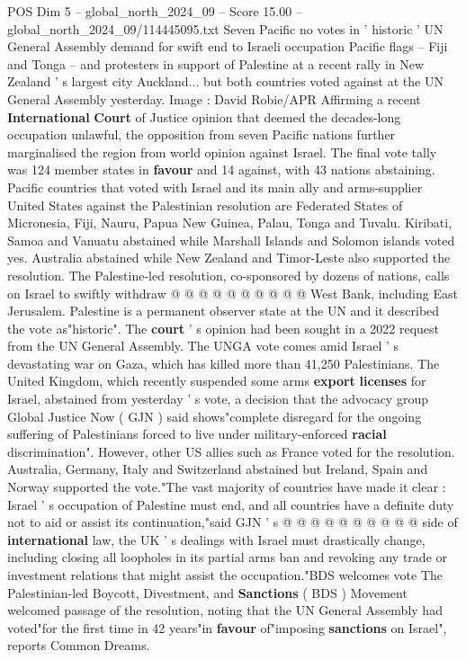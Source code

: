 \begin{textsample}{POS Dim 5 – global\_north\_2024\_09 – Score 15.00 – global\_north\_2024\_09/114445095.txt}  \label{ex:f5_pos_355}
Seven Pacific no votes in ' historic ' UN General Assembly demand for swift end to Israeli occupation Pacific flags -- Fiji and Tonga -- and protesters in support of Palestine at a recent rally in New Zealand ' s largest city Auckland... but both countries voted against at the UN General Assembly yesterday.
Image : David Robie/APR Affirming a recent \textbf{International} \textbf{Court} of Justice opinion that deemed the decades-long occupation unlawful, the opposition from seven Pacific nations further marginalised the region from world opinion against Israel.
The final vote tally was 124 member states in \textbf{favour} and 14 against, with 43 nations abstaining.
Pacific countries that voted with Israel and its main ally and arms-supplier United States against the Palestinian resolution are Federated States of Micronesia, Fiji, Nauru, Papua New Guinea, Palau, Tonga and Tuvalu.
Kiribati, Samoa and Vanuatu abstained while Marshall Islands and Solomon islands voted yes.
Australia abstained while New Zealand and Timor-Leste also supported the resolution.
The Palestine-led resolution, co-sponsored by dozens of nations, calls on Israel to swiftly withdraw @ @ @ @ @ @ @ @ @ @ West Bank, including East Jerusalem.
Palestine is a permanent observer state at the UN and it described the vote as"historic".
The \textbf{court} ' s opinion had been sought in a 2022 request from the UN General Assembly.
The UNGA vote comes amid Israel ' s devastating war on Gaza, which has killed more than 41,250 Palestinians.
The United Kingdom, which recently suspended some arms \textbf{export} \textbf{licenses} for Israel, abstained from yesterday ' s vote, a decision that the advocacy group Global Justice Now ( GJN ) said shows"complete disregard for the ongoing suffering of Palestinians forced to live under military-enforced \textbf{racial} discrimination".
However, other US allies such as France voted for the resolution.
Australia, Germany, Italy and Switzerland abstained but Ireland, Spain and Norway supported the vote."The vast majority of countries have made it clear : Israel ' s occupation of Palestine must end, and all countries have a definite duty not to aid or assist its continuation,"said GJN ' s @ @ @ @ @ @ @ @ @ @ side of \textbf{international} law, the UK ' s dealings with Israel must drastically change, including closing all loopholes in its partial arms ban and revoking any trade or investment relations that might assist the occupation."BDS welcomes vote The Palestinian-led Boycott, Divestment, and \textbf{Sanctions} ( BDS ) Movement welcomed passage of the resolution, noting that the UN General Assembly had voted"for the first time in 42 years"in \textbf{favour} of"imposing \textbf{sanctions} on Israel", reports Common Dreams.

\end{textsample}
